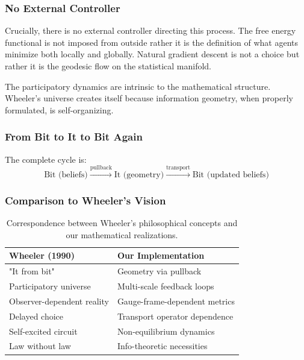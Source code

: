 \documentclass[11pt]{article}
\begin{document}
\subsubsection{No External Controller}

Crucially, there is no external controller directing this process. The free energy functional is not imposed from outside rather it is the definition of what agents minimize both locally and globally. Natural gradient descent is not a choice but rather it is the geodesic flow on the statistical manifold.

The participatory dynamics are intrinsic to the mathematical structure. Wheeler's universe creates itself because information geometry, when properly formulated, is self-organizing.

\subsubsection{From Bit to It to Bit Again}

The complete cycle is:
\begin{equation}
\boxed{\text{Bit (beliefs)} \xrightarrow{\text{pullback}} \text{It (geometry)} \xrightarrow{\text{transport}} \text{Bit (updated beliefs)}}
\end{equation}


\subsubsection{Comparison to Wheeler's Vision}

\begin{table}[h]
\centering
\begin{tabular}{|l|l|}
\hline
\textbf{Wheeler (1990)} & \textbf{Our Implementation} \\
\hline
"It from bit" & Geometry via pullback \\
Participatory universe & Multi-scale feedback loops \\
Observer-dependent reality & Gauge-frame-dependent metrics \\
Delayed choice & Transport operator dependence \\
Self-excited circuit & Non-equilibrium dynamics \\
Law without law & Info-theoretic necessities \\
\hline
\end{tabular}
\caption{Correspondence between Wheeler's philosophical concepts and our mathematical realizations.}
\label{tab:wheeler_comparison}
\end{table}
\end{document}
